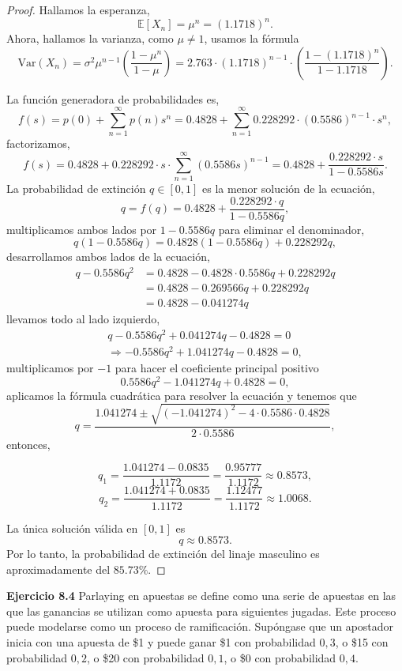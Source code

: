 \documentclass{article}
\begin{document}
\begin{proof}
Hallamos la esperanza,
\[
\mathbb{E}[X_n] = \mu^n = (1.1718)^n.
\]
Ahora, hallamos la varianza, como \( \mu \neq 1 \), usamos la fórmula
\[
\mathrm{Var}(X_n) = \sigma^2 \mu^{n - 1} \left( \frac{1 - \mu^n}{1 - \mu} \right)
= 2.763 \cdot (1.1718)^{n - 1} \cdot \left( \frac{1 - (1.1718)^n}{1 - 1.1718} \right).
\]

\item[(c)] La función generadora de probabilidades es,
\[
f(s) = p(0) + \sum_{n=1}^\infty p(n) s^n
= 0.4828 + \sum_{n=1}^\infty 0.228292 \cdot (0.5586)^{n - 1} \cdot s^n,
\]
factorizamos,
\[
f(s) = 0.4828 + 0.228292 \cdot s \cdot \sum_{n=1}^\infty (0.5586 s)^{n - 1}
= 0.4828 + \frac{0.228292 \cdot s}{1 - 0.5586 s}.
\]
La probabilidad de extinción \( q \in [0, 1] \) es la menor solución de la ecuación,
\[
q = f(q) = 0.4828 + \frac{0.228292 \cdot q}{1 - 0.5586 q},
\]
multiplicamos ambos lados por \( 1 - 0.5586 q \) para eliminar el denominador,
\[
q (1 - 0.5586 q) = 0.4828 (1 - 0.5586 q) + 0.228292 q,
\]
desarrollamos ambos lados de la ecuación,
\begin{align*}
q - 0.5586 q^2 &= 0.4828 - 0.4828 \cdot 0.5586 q + 0.228292 q \\
&= 0.4828 - 0.269566 q + 0.228292 q \\
&= 0.4828 - 0.041274 q 
\end{align*}
llevamos todo al lado izquierdo,
\begin{align*}
q - 0.5586 q^2 + 0.041274 q - 0.4828 = 0 \\
\Rightarrow -0.5586 q^2 + 1.041274 q - 0.4828 = 0, 
\end{align*}
multiplicamos por \( -1 \) para hacer el coeficiente principal positivo
\[
0.5586 q^2 - 1.041274 q + 0.4828 = 0,
\]
aplicamos la fórmula cuadrática para resolver la ecuación y tenemos que
\[
q = \frac{1.041274 \pm \sqrt{(-1.041274)^2 - 4 \cdot 0.5586 \cdot 0.4828}}{2 \cdot 0.5586},
\]
entonces,

\[
q_1 = \frac{1.041274 - 0.0835}{1.1172} = \frac{0.95777}{1.1172} \approx 0.8573,
\]
\[
q_2 = \frac{1.041274 + 0.0835}{1.1172} = \frac{1.12477}{1.1172} \approx 1.0068.
\]

La única solución válida en \( [0,1] \) es
\[
q \approx 0.8573.
\]
Por lo tanto, la probabilidad de extinción del linaje masculino es aproximadamente del \( 85.73\% \). 
\end{proof}


\textbf{Ejercicio 8.4}
Parlaying en apuestas se define como una serie de apuestas en las que las ganancias se utilizan como apuesta para siguientes jugadas. Este proceso puede modelarse como un proceso de ramificación. Supóngase que un apostador inicia con una apuesta de \$1 y puede ganar \$1 con probabilidad \(0{,}3\), o \$15 con probabilidad \(0{,}2\), o \$20 con probabilidad \(0{,}1\), o \$0 con probabilidad \(0{,}4\).
\end{document}
